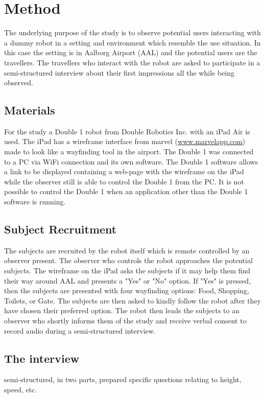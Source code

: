 \section{Method}
\label{Method}
The underlying purpose of the study is to observe potential users interacting with a dummy robot in a setting and environment which resemble the use situation. In this case the setting is in Aalborg Airport (AAL) and the potential users are the travellers. The travellers who interact with the robot are asked to participate in a semi-structured interview about their first impressions all the while being observed. 

\subsection{Materials}
For the study a Double 1 robot from Double Robotics Inc. with an iPad Air is used. The iPad has a wireframe interface from marvel (\url{www.marvelapp.com}) made to look like a wayfinding tool in the airport. The Double 1 was connected to a PC via WiFi connection and its own software. The Double 1 software allows a link to be displayed containing a web-page with the wireframe on the iPad while the observer still is able to control the Double 1 from the PC. It is not possible to control the Double 1 when an application other than the Double 1 software is running.

\subsection{Subject Recruitment}
 The subjects are recruited by the robot itself which is remote controlled by an observer present. The observer who controls the robot approaches the potential subjects. The wireframe on the iPad asks the subjects if it may help them find their way around AAL and presents a "Yes" or "No" option. If "Yes" is pressed, then the subjects are presented with four wayfinding options: Food, Shopping, Toilets, or Gate. The subjects are then asked to kindly follow the robot after they have chosen their preferred option. The robot then leads the subjects to an observer who shortly informs them of the study and receive verbal consent to record audio during a semi-structured interview.
 
 \subsection{The interview}
 semi-structured, in two parts, prepared specific questions relating to height, speed, etc.

